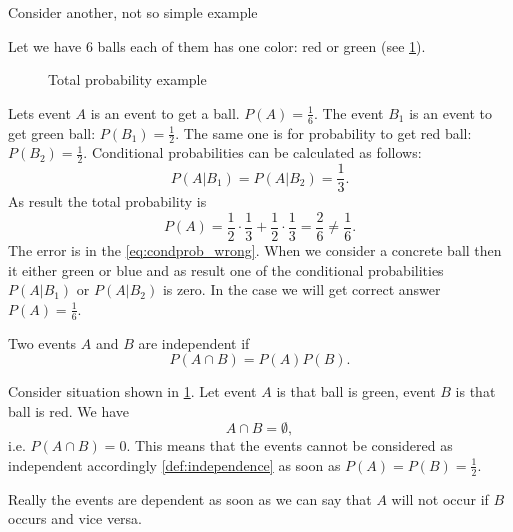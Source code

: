 Consider another, not so simple example
\begin{example}
Let we have 6 balls each of them has one color: red or green (see
\cref{fig:excondprobability_add}). 
\begin{figure}[H]
  \centering
  \caption{Total probability example}
  \label{fig:excondprobability_add}
\end{figure}
Lets event $A$ is an event to get a ball. $P(A) = \frac{1}{6}$. The
event $B_1$ is an event to get green ball: $P(B_1) = \frac{1}{2}$. The
same one is for probability to get red ball: $P(B_2) = \frac{1}{2}$.
Conditional probabilities can be calculated as follows:
\begin{equation}
P(A|B_1) = P(A|B_2) = \frac{1}{3}.
\label{eq:condprob_wrong}
\end{equation}
As result the total probability is 
\[
P(A) = \frac{1}{2}\cdot\frac{1}{3} + \frac{1}{2}\cdot\frac{1}{3} =
\frac{2}{6} \ne \frac{1}{6}.
\]
The error is in the \eqref{eq:condprob_wrong}. When we consider a
concrete ball then it either green or blue and as result one of the
conditional probabilities $P(A|B_1)$ or $P(A|B_2)$ is zero. In the
case we will get correct answer $P(A) = \frac{1}{6}$.
\end{example}

\begin{definition}[Independence]
\label{def:independence}
Two events $A$ and $B$ are independent if 
\[
P\left(A \cap B\right) = 
P\left(A\right) P\left(B\right). 
\]
\end{definition}

\begin{example}
Consider situation shown in \cref{fig:excondprobability_add}. Let
event $A$ is that ball is green, event $B$ is that ball is red. We
have
\[
A \cap B = \emptyset, 
\]
i.e. $P\left(A \cap B\right) = 0$. This means that the events cannot
be considered as independent accordingly \cref{def:independence} as
soon as $P\left(A\right) = 
P\left(B\right) = \frac{1}{2}$.

Really the events are dependent as soon as we can say that $A$ will
not occur if $B$ occurs and vice versa.
\end{example}

